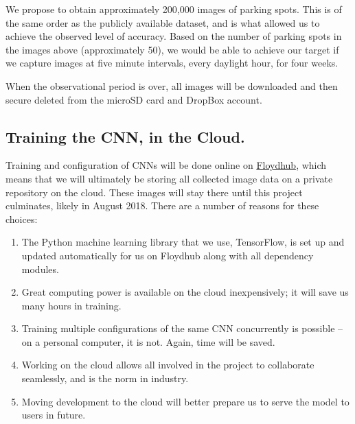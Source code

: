 \documentclass[]{article}
\begin{document}
We propose to obtain approximately 200,000 images of parking spots. This is of
the same order as the publicly available dataset, and is what allowed us to
achieve the observed level of accuracy. Based on the number of parking spots
in the images above (approximately 50), we would be able to achieve our target
if we capture images at five minute intervals, every daylight hour, for four
weeks. 

%
When the observational period is over, all images will be downloaded and
then secure deleted from the microSD card and DropBox account. 
%
%
%
\subsection{Training the CNN, in the Cloud.}\label{training-the-cnn-on-the-cloud.}

Training and configuration of CNNs will be done online on
\href{https://www.floydhub.com}{Floydhub}, which means that we will ultimately
be storing all collected image data on a private repository on the cloud. These
images will stay there until this project culminates, likely in August 2018.
There are a number of reasons for these choices:

\begin{enumerate}
  \item The Python machine learning library that we use, TensorFlow, is set up
and updated automatically for us on Floydhub along with all dependency modules.
  \item Great computing power is available on the cloud inexpensively; it will
  save us many hours in training.
  \item Training multiple configurations of the same CNN concurrently is
  possible -- on a personal computer, it is not. Again, time will be saved.
  \item Working on the cloud allows all involved in the project to collaborate
  seamlessly, and is the norm in industry.
  \item Moving development to the cloud will better prepare us to serve the
model to users in future.
\end{enumerate}
\end{document}
